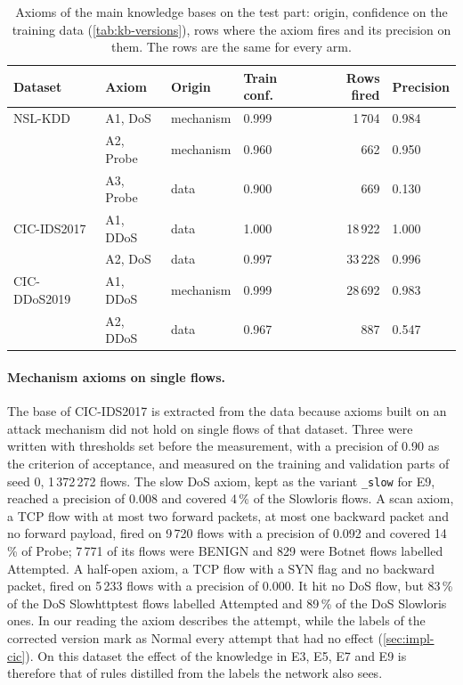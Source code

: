\begin{table}[t]
\centering
\footnotesize
\caption{Axioms of the main knowledge bases on the test part: origin, confidence on the training data
(\cref{tab:kb-versions}), rows where the axiom fires and its precision on them. The rows are the same for every
arm.}
\label{tab:res-rules}
\setlength{\tabcolsep}{4pt}
\begin{tabular}{@{}llllrl@{}}
\toprule
Dataset & Axiom & Origin & Train conf. & Rows fired & Precision \\
\midrule
NSL-KDD      & A1, DoS   & mechanism & 0.999 & 1\,704  & 0.984 \\
             & A2, Probe & mechanism & 0.960 & 662     & 0.950 \\
             & A3, Probe & data      & 0.900 & 669     & 0.130 \\
CIC-IDS2017  & A1, DDoS  & data      & 1.000 & 18\,922 & 1.000 \\
             & A2, DoS   & data      & 0.997 & 33\,228 & 0.996 \\
CIC-DDoS2019 & A1, DDoS  & mechanism & 0.999 & 28\,692 & 0.983 \\
             & A2, DDoS  & data      & 0.967 & 887     & 0.547 \\
\bottomrule
\end{tabular}
\end{table}

\paragraph{Mechanism axioms on single flows.}
The base of CIC-IDS2017 is extracted from the data because axioms built on an attack mechanism did not hold on
single flows of that dataset. Three were written with thresholds set before the measurement, with a precision of
0.90 as the criterion of acceptance, and measured on the training and validation parts of seed 0, 1\,372\,272
flows. The slow DoS axiom, kept as the variant \texttt{\_slow} for E9, reached a precision of 0.008 and covered
4\,\% of the Slowloris flows. A scan axiom, a TCP flow with at most two forward packets, at most one backward
packet and no forward payload, fired on 9\,720 flows with a precision of 0.092 and covered 14\,\% of Probe; 7\,771
of its flows were BENIGN and 829 were Botnet flows labelled Attempted. A half-open axiom, a TCP flow with a SYN
flag and no backward packet, fired on 5\,233 flows with a precision of 0.000. It hit no DoS flow, but 83\,\% of the
DoS Slowhttptest flows labelled Attempted and 89\,\% of the DoS Slowloris ones. In our reading the axiom describes
the attempt, while the labels of the corrected version mark as Normal every attempt that had no effect
(\cref{sec:impl-cic}). On this dataset the effect of the knowledge in E3, E5, E7 and E9 is therefore that of rules
distilled from the labels the network also sees.

